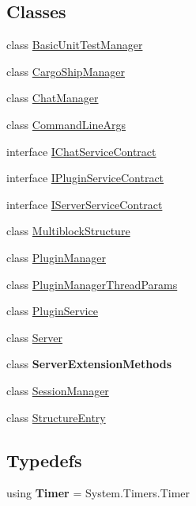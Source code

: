 \subsection*{Classes}
\begin{DoxyCompactItemize}
\item 
class \hyperlink{class_s_e_mod_a_p_i_extensions_1_1_a_p_i_1_1_basic_unit_test_manager}{Basic\+Unit\+Test\+Manager}
\item 
class \hyperlink{class_s_e_mod_a_p_i_extensions_1_1_a_p_i_1_1_cargo_ship_manager}{Cargo\+Ship\+Manager}
\item 
class \hyperlink{class_s_e_mod_a_p_i_extensions_1_1_a_p_i_1_1_chat_manager}{Chat\+Manager}
\item 
class \hyperlink{class_s_e_mod_a_p_i_extensions_1_1_a_p_i_1_1_command_line_args}{Command\+Line\+Args}
\item 
interface \hyperlink{interface_s_e_mod_a_p_i_extensions_1_1_a_p_i_1_1_i_chat_service_contract}{I\+Chat\+Service\+Contract}
\item 
interface \hyperlink{interface_s_e_mod_a_p_i_extensions_1_1_a_p_i_1_1_i_plugin_service_contract}{I\+Plugin\+Service\+Contract}
\item 
interface \hyperlink{interface_s_e_mod_a_p_i_extensions_1_1_a_p_i_1_1_i_server_service_contract}{I\+Server\+Service\+Contract}
\item 
class \hyperlink{class_s_e_mod_a_p_i_extensions_1_1_a_p_i_1_1_multiblock_structure}{Multiblock\+Structure}
\item 
class \hyperlink{class_s_e_mod_a_p_i_extensions_1_1_a_p_i_1_1_plugin_manager}{Plugin\+Manager}
\item 
class \hyperlink{class_s_e_mod_a_p_i_extensions_1_1_a_p_i_1_1_plugin_manager_thread_params}{Plugin\+Manager\+Thread\+Params}
\item 
class \hyperlink{class_s_e_mod_a_p_i_extensions_1_1_a_p_i_1_1_plugin_service}{Plugin\+Service}
\item 
class \hyperlink{class_s_e_mod_a_p_i_extensions_1_1_a_p_i_1_1_server}{Server}
\item 
class {\bfseries Server\+Extension\+Methods}
\item 
class \hyperlink{class_s_e_mod_a_p_i_extensions_1_1_a_p_i_1_1_session_manager}{Session\+Manager}
\item 
class \hyperlink{class_s_e_mod_a_p_i_extensions_1_1_a_p_i_1_1_structure_entry}{Structure\+Entry}
\end{DoxyCompactItemize}
\subsection*{Typedefs}
\begin{DoxyCompactItemize}
\item 
\hypertarget{namespace_s_e_mod_a_p_i_extensions_1_1_a_p_i_ad609d58db2b54afc23541efaa6d5afd3}{}using {\bfseries Timer} = System.\+Timers.\+Timer\label{namespace_s_e_mod_a_p_i_extensions_1_1_a_p_i_ad609d58db2b54afc23541efaa6d5afd3}

\end{DoxyCompactItemize}
